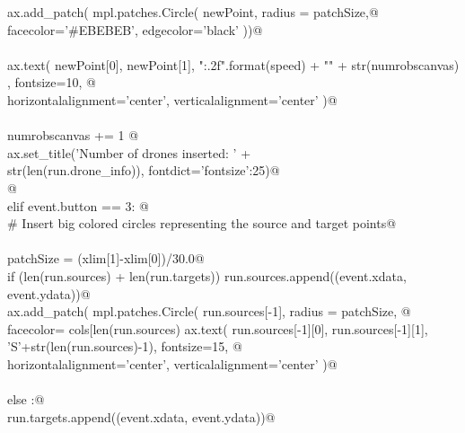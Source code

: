 \documentclass[10pt, english, oneside]{report}
\begin{document}
\begin{appendices}
\begin{flushleft}
\begin{list}{}{}
\mbox{}\verb@                 ax.add_patch( mpl.patches.Circle( newPoint, radius = patchSize,@\\
\mbox{}\verb@                                                   facecolor='#EBEBEB', edgecolor='black'  ))@\\
\mbox{}\verb@@\\
\mbox{}\verb@                 ax.text( newPoint[0], newPoint[1], "{:.2f}".format(speed) + "\n" + str(numrobscanvas) , fontsize=10, @\\
\mbox{}\verb@                          horizontalalignment='center', verticalalignment='center' )@\\
\mbox{}\verb@@\\
\mbox{}\verb@                 numrobscanvas += 1    @\\
\mbox{}\verb@                 ax.set_title('Number of drones inserted: ' +\@\\
\mbox{}\verb@                              str(len(run.drone_info)), fontdict={'fontsize':25})@\\
\mbox{}\verb@                 @\\
\mbox{}\verb@             elif event.button == 3:  @\\
\mbox{}\verb@                 # Insert big colored circles representing the source and target points@\\
\mbox{}\verb@@\\
\mbox{}\verb@                 patchSize  = (xlim[1]-xlim[0])/30.0@\\
\mbox{}\verb@                 if (len(run.sources) + len(run.targets)) % 2 == 0 : @\\
\mbox{}\verb@                        run.sources.append((event.xdata, event.ydata))@\\
\mbox{}\verb@                        ax.add_patch( mpl.patches.Circle( run.sources[-1], radius = patchSize, @\\
\mbox{}\verb@                                                   facecolor= cols[len(run.sources) % len(cols)], edgecolor='black', lw=1.0 ))@\\
\mbox{}\verb@                        ax.text( run.sources[-1][0], run.sources[-1][1], 'S'+str(len(run.sources)-1), fontsize=15, @\\
\mbox{}\verb@                                 horizontalalignment='center', verticalalignment='center' )@\\
\mbox{}\verb@@\\
\mbox{}\verb@                 else :@\\
\mbox{}\verb@                      run.targets.append((event.xdata, event.ydata))@\\

\end{list}
\end{flushleft}
\end{appendices}
\end{document}
